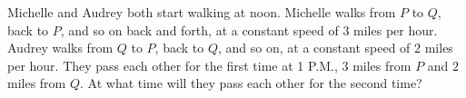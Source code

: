 Michelle and Audrey both start walking at noon. Michelle walks from $P$ to $Q$, back to $P$, and so on back and forth, at a constant speed of $3$ miles per hour. Audrey walks from $Q$ to $P$, back to $Q$, and so on, at a constant speed of $2$ miles per hour. They pass each other for the first time at 1 P.M., $3$ miles from $P$ and $2$ miles from $Q$. At what time will they pass each other for the second time?
